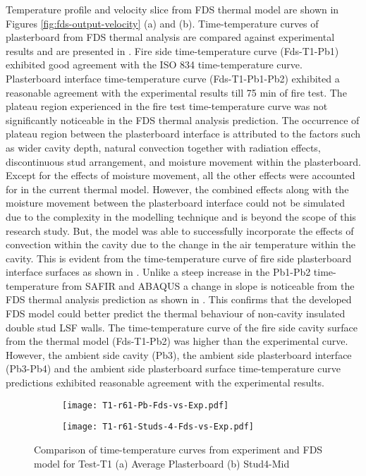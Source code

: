 Temperature profile and velocity slice from FDS thermal model are shown in Figures \ref{fig:fds-output-velocity} (a) and (b). Time-temperature curves of plasterboard from FDS thermal analysis are compared against experimental results and are presented in .  Fire side time-temperature curve (Fds-T1-Pb1) exhibited good agreement with the ISO 834 time-temperature curve. Plasterboard interface time-temperature curve (Fds-T1-Pb1-Pb2) exhibited a reasonable agreement with the experimental results till 75 min of fire test. The plateau region experienced in the fire test time-temperature curve was not significantly noticeable in the FDS thermal analysis prediction. The occurrence of plateau region between the plasterboard interface is attributed to the factors such as wider cavity depth, natural convection together with radiation effects, discontinuous stud arrangement, and moisture movement within the plasterboard. Except for the effects of moisture movement, all the other effects were accounted for in the current thermal model. However, the combined effects along with the moisture movement between the plasterboard interface could not be simulated due to the complexity in the modelling technique and is beyond the scope of this research study. But, the model was able to successfully incorporate the effects of convection within the cavity due to the change in the air temperature within the cavity. This is evident from the time-temperature curve of fire side plasterboard interface surfaces as shown in . Unlike a steep increase in the Pb1-Pb2 time-temperature from SAFIR and ABAQUS a change in slope is noticeable from the FDS thermal analysis prediction as shown in . This confirms that the developed FDS model could better predict the thermal behaviour of non-cavity insulated double stud LSF walls. The time-temperature curve of the fire side cavity surface from the thermal model (Fds-T1-Pb2) was higher than the experimental curve. However, the ambient side cavity (Pb3), the ambient side plasterboard interface (Pb3-Pb4) and the ambient side plasterboard surface time-temperature curve predictions exhibited reasonable agreement with the experimental results.
\begin{figure}[!htbp]
	\centering
	\begin{subfigure}[b]{0.7\textwidth}
		\centering
		\texttt{[image: T1-r61-Pb-Fds-vs-Exp.pdf]}
		\caption{}
		\label{subfig:T1-r61-Pb-Fds-vs-Exp}
	\end{subfigure}
	\begin{subfigure}[b]{0.6\textwidth}
		\centering
		\texttt{[image: T1-r61-Studs-4-Fds-vs-Exp.pdf]}
		\caption{}
		\label{subfig:T1-r61-Studs-4-Fds-vs-Exp}
	\end{subfigure}
	   \caption{Comparison of time-temperature curves from experiment and FDS model for Test-T1 (a) Average Plasterboard (b) Stud4-Mid}
	   \label{fig:fds-output-pb-studs-t1}
\end{figure}
